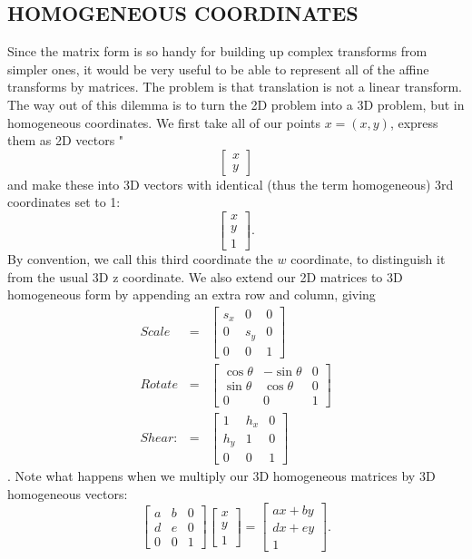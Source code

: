 \documentclass[11pt]{amsart}
\begin{document}
\subsection{HOMOGENEOUS COORDINATES}
Since the matrix form is so handy for building up complex transforms from simpler ones,
it would be very useful to be able to represent all of the affine transforms by matrices.
The problem is that translation is not a linear transform. The way out of this dilemma is
to turn the 2D problem into a 3D problem, but in homogeneous coordinates.
We first take all of our points $x = (x, y)$, express them as 2D vectors "
\[
\begin{bmatrix}
x \\
y
\end{bmatrix}
\]
and make these
into 3D vectors with identical (thus the term homogeneous) 3rd coordinates set to 1:
\[
\begin{bmatrix}
x \\
y \\
1
\end{bmatrix}.
\]
By convention, we call this third coordinate the $w$ coordinate, to distinguish it from the
usual 3D z coordinate. We also extend our 2D matrices to 3D homogeneous form by
appending an extra row and column, giving
\begin{eqnarray}
Scale & = &  
\begin{bmatrix}
s_x & 0 & 0\\
0 & s_y & 0 \\
0 & 0 & 1
\end{bmatrix}
\\
 Rotate & = & 
\begin{bmatrix}
\cos \theta & -\sin \theta & 0 \\
\sin \theta &  \cos \theta & 0 \\
0 & 0 & 1
\end{bmatrix} 
\\
Shear: & = & 
\begin{bmatrix}
1 & h_x & 0 \\
h_y & 1 & 0 \\
0 & 0 & 1
\end{bmatrix}
\end{eqnarray}.
Note what happens when we multiply our 3D homogeneous matrices by 3D homogeneous vectors:
\begin{equation}
\begin{bmatrix}
a & b & 0 \\
d & e & 0 \\
0 & 0 & 1
\end{bmatrix}
\begin{bmatrix}
x \\
y \\
1
\end{bmatrix}
=
\begin{bmatrix}
ax + by \\
dx + ey \\
1
\end{bmatrix}.
\end{equation}
\end{document}
